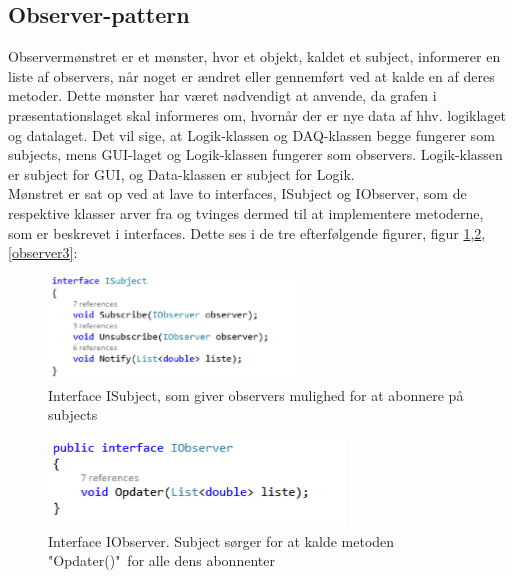 \subsection{Observer-pattern}
Observermønstret er et mønster, hvor et objekt, kaldet et subject, informerer en liste af observers, når noget er ændret eller gennemført ved at kalde en af deres metoder. Dette mønster har været nødvendigt at anvende, da grafen i præsentationslaget skal informeres om, hvornår der er nye data af hhv. logiklaget og datalaget. Det vil sige, at Logik-klassen og DAQ-klassen begge fungerer som subjects, mens GUI-laget og Logik-klassen fungerer som observers. Logik-klassen er subject for GUI, og Data-klassen er subject for Logik.\\
Mønstret er sat op ved at lave to interfaces, ISubject og IObserver, som de respektive klasser arver fra og tvinges dermed til at implementere metoderne, som er beskrevet i interfaces. Dette ses i de tre efterfølgende figurer, figur \ref{observer1},\ref{observer2}, \ref{observer3}:

\begin{figure}[H]
	\centering
	\includegraphics[width=0.6\textwidth]{Figurer/SoftwareImplementering/observer1}
	\caption{Interface ISubject, som giver observers mulighed for at abonnere på subjects}
	\label{observer1}
\end{figure}

\begin{figure}[H]
	\centering
	\includegraphics[width=0.7\textwidth]{Figurer/SoftwareImplementering/observer2}
	\caption{Interface IObserver. Subject sørger for at kalde metoden "Opdater()"\ for alle dens abonnenter}
	\label{observer2}
\end{figure}

